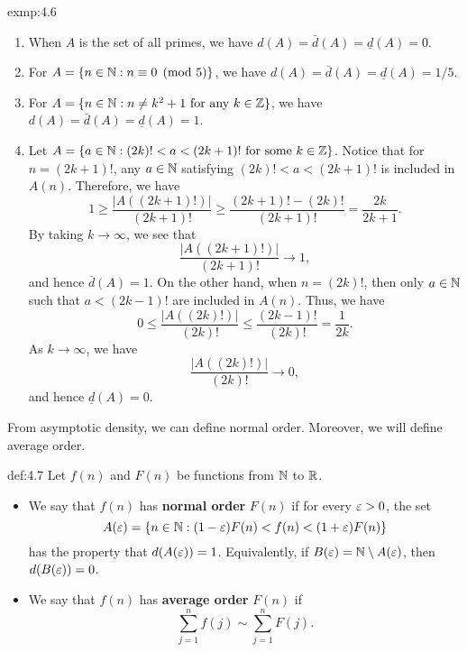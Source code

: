 \begin{exmp}{exmp:4.6}
    \begin{enumerate}[(1)]
        \item When $A$ is the set of all primes, we have 
        $d(A) = \bar{d}(A) = \underline{d}(A) = 0$. 
        \item For $A = \{n \in \mathbb{N} : n \equiv 0 \pmod 5\}$, we have 
        $d(A) = \bar{d}(A) = \underline{d}(A) = 1/5$.
        \item For $A = \{n \in \mathbb{N} : n \neq k^2 + 1 \text{ for any } k \in \mathbb{Z}\}$, 
        we have $d(A) = \bar{d}(A) = \underline{d}(A) = 1$.
        \item Let $A = \{a \in \mathbb{N} : (2k)! < a < (2k+1)! \text{ for some } k \in \mathbb{Z}\}$. 
        Notice that for $n = (2k+1)!$, any $a \in \mathbb{N}$ satisfying $(2k)! < a < 
        (2k+1)!$ is included in $A(n)$. Therefore, we have 
        \[ 1 \geq \frac{|A((2k+1)!)|}{(2k+1)!} \geq \frac{(2k+1)! - (2k)!}{(2k+1)!} 
        = \frac{2k}{2k+1}. \] 
        By taking $k \to \infty$, we see that 
        \[ \frac{|A((2k+1)!)|}{(2k+1)!} \to 1, \] 
        and hence $\bar{d}(A) = 1$. On the other hand, when $n = (2k)!$, then only 
        $a \in \mathbb{N}$ such that $a < (2k-1)!$ are included in $A(n)$. Thus, we have 
        \[ 0 \leq \frac{|A((2k)!)|}{(2k)!} \leq \frac{(2k-1)!}{(2k)!} = \frac{1}{2k}. \] 
        As $k \to \infty$, we have 
        \[ \frac{|A((2k)!)|}{(2k)!} \to 0, \] 
        and hence $\underline{d}(A) = 0$.
    \end{enumerate} 
\end{exmp}

From asymptotic density, we can define normal order. 
Moreover, we will define average order. 

\begin{defn}{def:4.7}
    Let $f(n)$ and $F(n)$ be functions from $\mathbb{N}$ to $\mathbb{R}$. 
    \begin{itemize}
        \item We say that $f(n)$ has {\bf normal order} $F(n)$ if for every 
        $\varepsilon > 0$, the set 
        \[ A(\varepsilon) = \{n \in \mathbb{N} : (1-\varepsilon)F(n) < f(n) < (1+\varepsilon)F(n)\} \] 
        has the property that $d(A(\varepsilon)) = 1$. Equivalently, if $B(\varepsilon) 
        = \mathbb{N} \setminus A(\varepsilon)$, then $d(B(\varepsilon)) = 0$. 
        \item We say that $f(n)$ has {\bf average order} $F(n)$ if 
        \[ \sum_{j=1}^n f(j) \sim \sum_{j=1}^n F(j). \] 
    \end{itemize}
\end{defn}

